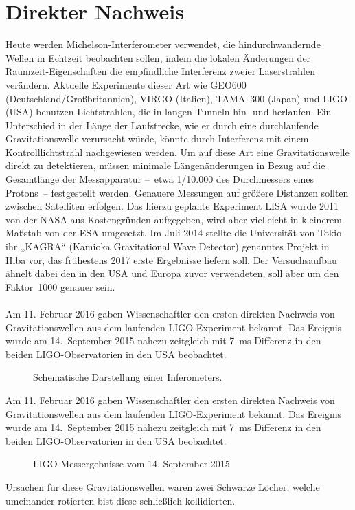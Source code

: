 \section{Direkter Nachweis}
Heute werden Michelson-Interferometer verwendet, die hindurchwandernde Wellen in Echtzeit beobachten sollen, indem die lokalen Änderungen der Raumzeit-Eigenschaften die empfindliche Interferenz zweier Laserstrahlen verändern. Aktuelle Experimente dieser Art wie GEO600 (Deutschland/Großbritannien), VIRGO (Italien), TAMA 300 (Japan) und LIGO (USA) benutzen Lichtstrahlen, die in langen Tunneln hin- und herlaufen. Ein Unterschied in der Länge der Laufstrecke, wie er durch eine durchlaufende Gravitationswelle verursacht würde, könnte durch Interferenz mit einem Kontrolllichtstrahl nachgewiesen werden. Um auf diese Art eine Gravitationswelle direkt zu detektieren, müssen minimale Längenänderungen in Bezug auf die Gesamtlänge der Messapparatur – etwa 1/10.000 des Durchmessers eines Protons – festgestellt werden. Genauere Messungen auf größere Distanzen sollten zwischen Satelliten erfolgen. Das hierzu geplante Experiment LISA wurde 2011 von der NASA aus Kostengründen aufgegeben, wird aber vielleicht in kleinerem Maßstab von der ESA umgesetzt. Im Juli 2014 stellte die Universität von Tokio ihr „KAGRA“ (Kamioka Gravitational Wave Detector) genanntes Projekt in Hiba vor, das frühestens 2017 erste Ergebnisse liefern soll. Der Versuchsaufbau ähnelt dabei den in den USA und Europa zuvor verwendeten, soll aber um den Faktor 1000 genauer sein. \\\\
Am 11. Februar 2016 gaben Wissenschaftler den ersten direkten Nachweis von Gravitationswellen aus dem laufenden LIGO-Experiment bekannt. Das Ereignis wurde am 14. September 2015 nahezu zeitgleich mit 7 ms Differenz in den beiden LIGO-Observatorien in den USA beobachtet.
\begin{figure}
	\centering
	\caption[Interferometer]{Schematische Darstellung einer Inferometers.}
	\label{fig-flower}
\end{figure}
\newpage
Am 11. Februar 2016 gaben Wissenschaftler den ersten direkten Nachweis von Gravitationswellen aus dem laufenden LIGO-Experiment bekannt. Das Ereignis wurde am 14. September 2015 nahezu zeitgleich mit 7 ms Differenz in den beiden LIGO-Observatorien in den USA beobachtet.
\begin{figure}
	\centering{}
	\caption[LIGO-Messung]{LIGO-Messergebnisse vom 14. September 2015}
\end{figure}

Ursachen für diese Gravitationswellen waren zwei Schwarze Löcher, welche umeinander rotierten bist diese schließlich kollidierten.

